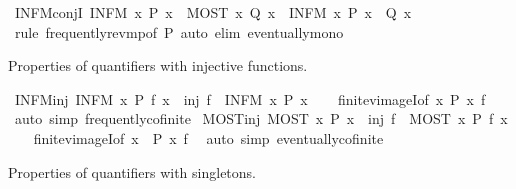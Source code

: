 \begin{isabellebody}
\isamarkupfalse%
\ INFM{\isacharunderscore}conjI{\isacharcolon}\ {\isachardoublequoteopen}INFM\ x{\isachardot}\ P\ x\ {\isasymLongrightarrow}\ MOST\ x{\isachardot}\ Q\ x\ {\isasymLongrightarrow}\ INFM\ x{\isachardot}\ P\ x\ {\isasymand}\ Q\ x{\isachardoublequoteclose}\isanewline
%
\isadelimproof
\ \ %
\endisadelimproof
%
\isatagproof
{}\isamarkupfalse%
\ {\isacharparenleft}rule\ frequently{\isacharunderscore}rev{\isacharunderscore}mp{\isacharbrackleft}of\ P{\isacharbrackright}{\isacharparenright}\ {\isacharparenleft}auto\ elim{\isacharcolon}\ eventually{\isacharunderscore}mono{\isacharparenright}%
\endisatagproof
{\isafoldproof}%
%
\isadelimproof
%
\endisadelimproof
%
\begin{isamarkuptext}%
Properties of quantifiers with injective functions.%
\end{isamarkuptext}\isamarkuptrue%
\isamarkupfalse%
\ INFM{\isacharunderscore}inj{\isacharcolon}\ {\isachardoublequoteopen}INFM\ x{\isachardot}\ P\ {\isacharparenleft}f\ x{\isacharparenright}\ {\isasymLongrightarrow}\ inj\ f\ {\isasymLongrightarrow}\ INFM\ x{\isachardot}\ P\ x{\isachardoublequoteclose}\isanewline
%
\isadelimproof
\ \ %
\endisadelimproof
%
\isatagproof
{}\isamarkupfalse%
\ finite{\isacharunderscore}vimageI{\isacharbrackleft}of\ {\isachardoublequoteopen}{\isacharbraceleft}x{\isachardot}\ P\ x{\isacharbraceright}{\isachardoublequoteclose}\ f{\isacharbrackright}\ \isamarkupfalse%
\ {\isacharparenleft}auto\ simp{\isacharcolon}\ frequently{\isacharunderscore}cofinite{\isacharparenright}%
\endisatagproof
{\isafoldproof}%
%
\isadelimproof
\isanewline
%
\endisadelimproof
\isanewline
{}\isamarkupfalse%
\ MOST{\isacharunderscore}inj{\isacharcolon}\ {\isachardoublequoteopen}MOST\ x{\isachardot}\ P\ x\ {\isasymLongrightarrow}\ inj\ f\ {\isasymLongrightarrow}\ MOST\ x{\isachardot}\ P\ {\isacharparenleft}f\ x{\isacharparenright}{\isachardoublequoteclose}\isanewline
%
\isadelimproof
\ \ %
\endisadelimproof
%
\isatagproof
{}\isamarkupfalse%
\ finite{\isacharunderscore}vimageI{\isacharbrackleft}of\ {\isachardoublequoteopen}{\isacharbraceleft}x{\isachardot}\ {\isasymnot}\ P\ x{\isacharbraceright}{\isachardoublequoteclose}\ f{\isacharbrackright}\ \isamarkupfalse%
\ {\isacharparenleft}auto\ simp{\isacharcolon}\ eventually{\isacharunderscore}cofinite{\isacharparenright}%
\endisatagproof
{\isafoldproof}%
%
\isadelimproof
%
\endisadelimproof
%
\begin{isamarkuptext}%
Properties of quantifiers with singletons.%

\end{isamarkuptext}
\end{isabellebody}
